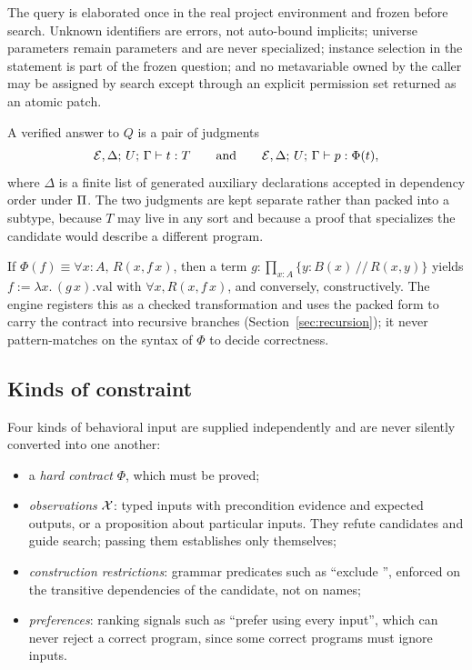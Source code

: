 The query is elaborated once in the real project environment and frozen before search. Unknown identifiers are errors, not auto-bound implicits; universe parameters remain parameters and are never specialized; instance selection in the statement is part of the frozen question; and no metavariable owned by the caller may be assigned by search except through an explicit permission set returned as an atomic patch.

\begin{definition}[Answer]\label{def:answer}
A verified answer to $Q$ is a pair of judgments
\[
\mathcal{E},\Delta;\,U;\,\Gamma \vdash t : T \qquad\text{and}\qquad \mathcal{E},\Delta;\,U;\,\Gamma \vdash p : \Phi(t),
\]
where $\Delta$ is a finite list of generated auxiliary declarations accepted in dependency order under $\Pi$. The two judgments are kept separate rather than packed into a subtype, because $T$ may live in any sort and because a proof that specializes the candidate would describe a different program.
\end{definition}

\begin{proposition}\label{prop:pointwise}
If $\Phi(f) \equiv \forall x{:}A,\, R(x, f\,x)$, then a term $g : \prod_{x:A}\{y : B(x) \,//\, R(x,y)\}$ yields $f := \lambda x.\,(g\,x).\mathrm{val}$ with $\forall x, R(x, f\,x)$, and conversely, constructively. The engine registers this as a checked transformation and uses the packed form to carry the contract into recursive branches (Section~\ref{sec:recursion}); it never pattern-matches on the syntax of $\Phi$ to decide correctness.
\end{proposition}

\subsection{Kinds of constraint}\label{sec:constraint-kinds}

Four kinds of behavioral input are supplied independently and are never silently converted into one another:
\begin{itemize}
\item a \emph{hard contract} $\Phi$, which must be proved;
\item \emph{observations} $\mathcal{X}$: typed inputs with precondition evidence and expected outputs, or a proposition about particular inputs. They refute candidates and guide search; passing them establishes only themselves;
\item \emph{construction restrictions}: grammar predicates such as ``exclude '', enforced on the transitive dependencies of the candidate, not on names;
\item \emph{preferences}: ranking signals such as ``prefer using every input'', which can never reject a correct program, since some correct programs must ignore inputs.
\end{itemize}

